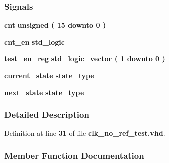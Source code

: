 \subsubsection*{Signals}
 \begin{DoxyCompactItemize}
\item 
{\bf cnt} {\bfseries \textcolor{comment}{unsigned}\textcolor{vhdlchar}{ }\textcolor{vhdlchar}{(}\textcolor{vhdlchar}{ }\textcolor{vhdlchar}{ } \textcolor{vhdldigit}{15} \textcolor{vhdlchar}{ }\textcolor{keywordflow}{downto}\textcolor{vhdlchar}{ }\textcolor{vhdlchar}{ } \textcolor{vhdldigit}{0} \textcolor{vhdlchar}{ }\textcolor{vhdlchar}{)}\textcolor{vhdlchar}{ }} 
\item 
{\bf cnt\+\_\+en} {\bfseries \textcolor{comment}{std\+\_\+logic}\textcolor{vhdlchar}{ }} 
\item 
{\bf test\+\_\+en\+\_\+reg} {\bfseries \textcolor{comment}{std\+\_\+logic\+\_\+vector}\textcolor{vhdlchar}{ }\textcolor{vhdlchar}{(}\textcolor{vhdlchar}{ }\textcolor{vhdlchar}{ } \textcolor{vhdldigit}{1} \textcolor{vhdlchar}{ }\textcolor{keywordflow}{downto}\textcolor{vhdlchar}{ }\textcolor{vhdlchar}{ } \textcolor{vhdldigit}{0} \textcolor{vhdlchar}{ }\textcolor{vhdlchar}{)}\textcolor{vhdlchar}{ }} 
\item 
{\bf current\+\_\+state} {\bfseries {\bfseries {\bf state\+\_\+type}} \textcolor{vhdlchar}{ }} 
\item 
{\bf next\+\_\+state} {\bfseries {\bfseries {\bf state\+\_\+type}} \textcolor{vhdlchar}{ }} 
\end{DoxyCompactItemize}


\subsubsection{Detailed Description}


Definition at line {\bf 31} of file {\bf clk\+\_\+no\+\_\+ref\+\_\+test.\+vhd}.



\subsubsection{Member Function Documentation}

